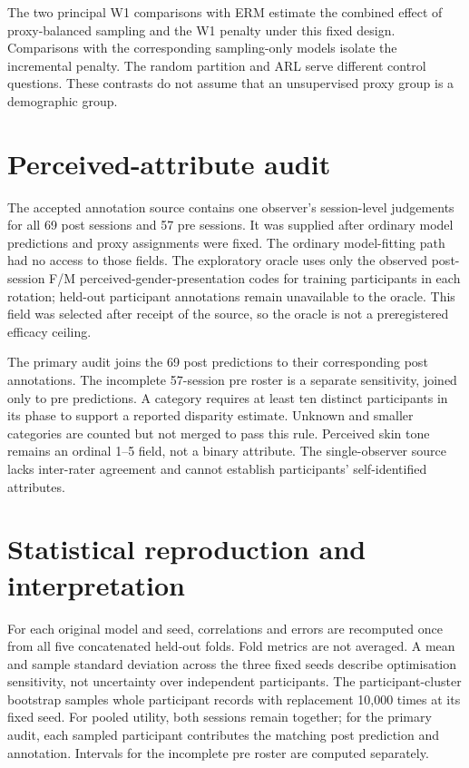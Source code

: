 The two principal W1 comparisons with ERM estimate the combined effect of proxy-balanced
sampling and the W1 penalty under this fixed design. Comparisons with the corresponding
sampling-only models isolate the incremental penalty. The random partition and ARL serve
different control questions. These contrasts do not assume that an unsupervised proxy group
is a demographic group.

\section{Perceived-attribute audit}

The accepted annotation source contains one observer's session-level judgements for all 69
post sessions and 57 pre sessions. It was supplied after ordinary model predictions and proxy
assignments were fixed. The ordinary model-fitting path had no access to those fields. The
exploratory oracle uses only the observed post-session F/M perceived-gender-presentation
codes for training participants in each rotation; held-out participant annotations remain
unavailable to the oracle. This field was selected after receipt of the source, so the
oracle is not a preregistered efficacy ceiling.

The primary audit joins the 69 post predictions to their corresponding post annotations.
The incomplete 57-session pre roster is a separate sensitivity, joined only to pre
predictions. A category requires at least ten distinct participants in its phase to
support a reported disparity estimate. Unknown and smaller categories are counted but not
merged to pass this rule. Perceived skin tone remains an ordinal 1--5 field, not a binary
attribute. The single-observer source lacks inter-rater agreement and cannot establish
participants' self-identified attributes.

\section{Statistical reproduction and interpretation}

For each original model and seed, correlations and errors are recomputed once from all five
concatenated held-out folds. Fold metrics are not averaged. A mean and sample standard
deviation across the three fixed seeds describe optimisation sensitivity, not uncertainty
over independent participants. The participant-cluster bootstrap samples whole participant
records with replacement 10,000 times at its fixed seed. For pooled utility, both sessions
remain together; for the primary audit, each sampled participant contributes the matching
post prediction and annotation. Intervals for the incomplete pre roster are computed
separately.

